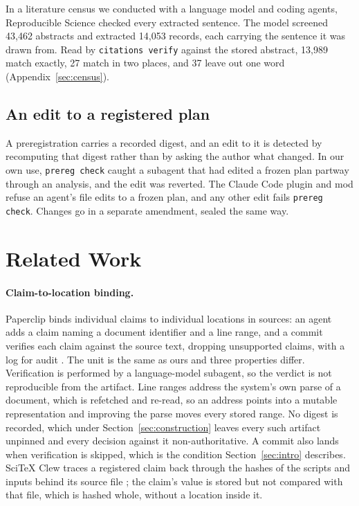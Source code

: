 \documentclass{article}
\newcommand{\code}[1]{\texttt{#1}}
\begin{document}
In a literature census we conducted with a language model and coding agents, Reproducible Science checked every extracted sentence.
The model screened 43{,}462 abstracts and extracted 14{,}053 records, each carrying the
sentence it was drawn from. Read by \code{citations verify} against the stored abstract,
13{,}989 match exactly, 27 match in two places, and 37 leave out one word
(Appendix~\ref{sec:census}).

\subsection{An edit to a registered plan}

A preregistration carries a recorded digest, and an edit to it is detected by recomputing that
digest rather than by asking the author what changed. In our own use, \code{prereg check} caught
a subagent that had edited a frozen plan partway through an analysis, and the edit was reverted.
The Claude Code plugin and mod refuse an agent's file edits to a frozen plan, and any other edit
fails \code{prereg check}. Changes go in a separate amendment, sealed the same way.

\section{Related Work}
\label{sec:related}

\paragraph{Claim-to-location binding.} Paperclip binds individual claims to individual locations
in sources: an agent adds a claim naming a document identifier and a line range, and a commit
verifies each claim against the source text, dropping unsupported claims, with a log for audit
\citep{gxl2026paperclip}. The unit is the same as ours and three properties differ. Verification
is performed by a language-model subagent, so the verdict is not reproducible from the artifact.
Line ranges address the system's own parse of a document, which is refetched and re-read, so an
address points into a mutable representation and improving the parse moves every stored range. No
digest is recorded, which under Section~\ref{sec:construction} leaves every such artifact unpinned
and every decision against it non-authoritative. A commit also lands when verification is skipped,
which is the condition Section~\ref{sec:intro} describes. SciTeX Clew traces a registered
claim back through the hashes of the scripts and inputs behind its source file
\citep{watanabe2026clew}; the claim's value is stored but not compared with that file, which is hashed
whole, without a location inside it.
\end{document}
